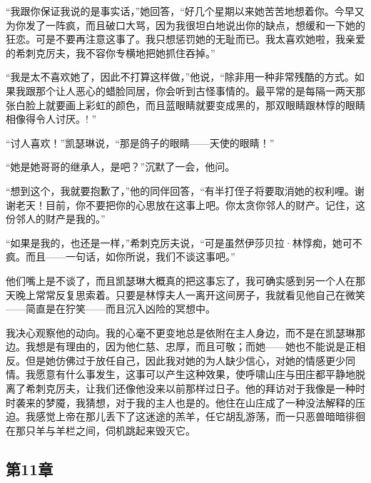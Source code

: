 \par “我跟你保证我说的是事实话，”她回答，“好几个星期以来她苦苦地想着你。今早又为你发了一阵疯，而且破口大骂，因为我很坦白地说出你的缺点，想缓和一下她的狂恋。可是不要再注意这事了。我只想惩罚她的无耻而已。我太喜欢她啦，我亲爱的希刺克厉夫，我不容你专横地把她抓住吞掉。”
\par “我是太不喜欢她了，因此不打算这样做，”他说，“除非用一种非常残酷的方式。如果我跟那个让人恶心的蜡脸同居，你会听到古怪事情的。最平常的是每隔一两天那张白脸上就要画上彩虹的颜色，而且蓝眼睛就要变成黑的，那双眼睛跟林惇的眼睛相像得令人讨厌。! ”
\par “讨人喜欢！”凯瑟琳说，“那是鸽子的眼睛——天使的眼睛！”
\par “她是她哥哥的继承人，是吧？”沉默了一会，他问。
\par “想到这个，我就要抱歉了，”他的同伴回答，“有半打侄子将要取消她的权利哩。谢谢老天！目前，你不要把你的心思放在这事上吧。你太贪你邻人的财产。记住，这份邻人的财产是我的。”
\par “如果是我的，也还是一样，”希刺克厉夫说，“可是虽然伊莎贝拉·林惇痴，她可不疯。而且——一句话，如你所说，我们不谈这事吧。”
\par 他们嘴上是不谈了，而且凯瑟琳大概真的把这事忘了，我可确实感到另一个人在那天晚上常常反复思索着。只要是林惇夫人一离开这间房子，我就看见他自己在微笑——简直是在狞笑——而且沉入凶险的冥想中。
\par 我决心观察他的动向。我的心毫不更变地总是依附在主人身边，而不是在凯瑟琳那边。我想是有理由的，因为他仁慈、忠厚，而且可敬；而她——她也不能说是正相反。但是她仿佛过于放任自己，因此我对她的为人缺少信心，对她的情感更少同情。我愿意有什么事发生，这事可以产生这种效果，使呼啸山庄与田庄都平静地脱离了希刺克厉夫，让我们还像他没来以前那样过日子。他的拜访对于我像是一种时时袭来的梦魇，我猜想，对于我的主人也是的。他住在山庄成了一种没法解释的压迫。我感觉上帝在那儿丢下了这迷途的羔羊，任它胡乱游荡，而一只恶兽暗暗徘徊在那只羊与羊栏之间，伺机跳起来毁灭它。


\subsection{第11章}

